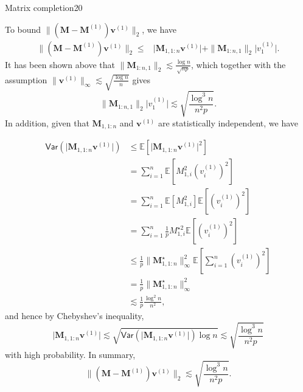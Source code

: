 \documentclass{article}
\begin{document}
\begin{problem}{Matrix completion}{20}
{To bound $\|( {\bm{M}}- {\bm{M}}^{(1)}) {\bm{v}}^{(1)}\|_{2}$,
we have
\begin{align*}
\|( {\bm{M}}- {\bm{M}}^{(1)}) {\bm{v}}^{(1)}\|_{2}\leq & \big| {\bm{M}}_{1,1:n} {\bm{v}}^{(1)}\big|+\| {\bm{M}}_{1:n,1}\|_{2}\big| {v}_{1}^{(1)}\big|.
\end{align*}
It has been shown above that $\| {\bm{M}}_{1:n,1}\|_{2}\lesssim\frac{\log n}{\sqrt{np}}$,
which together with the assumption $\| {\bm{v}}^{(1)}\|_{\infty}\lesssim\sqrt{\frac{\log n}{n}}$
gives
\[
\| {\bm{M}}_{1:n,1}\|_{2}\big| {v}_{1}^{(1)}\big|\lesssim\sqrt{\frac{\log^{3}n}{n^{2}p}}.
\]
In addition, given that $ {\bm{M}}_{1,1:n}$ and $ {\bm{v}}^{(1)}$
are statistically independent, we have

\begin{align*}
\mathsf{Var}\left(\big| {\bm{M}}_{1,1:n} {\bm{v}}^{(1)}\big|\right) & \leq\mathbb{E}\left[\big| {\bm{M}}_{1,1:n} {\bm{v}}^{(1)}\big|^{2}\right]\\
 & =\sum_{i=1}^{n} \mathbb{E}\left[  {M}^2_{1,i} ( {v}_{i}^{(1)})^2 \right] \\
  & =\sum_{i=1}^{n} \mathbb{E}\left[  {M}^2_{1,i} \right] \mathbb{E}\left[ ( {v}_{i}^{(1)})^2 \right] \\
 & =\sum_{i=1}^{n} \frac{1}{p} M^{\star2}_{1,i} \mathbb{E}\left[ ( {v}_{i}^{(1)})^2 \right] \\
 & \leq \frac{1}{p}\|\bm{M}^\star_{1,1:n} \|_{\infty}^{2} \mathbb{E}\left[ \sum_{i=1}^{n} ( {v}_{i}^{(1)})^2 \right] \\
 & = \frac{1}{p}\|\bm{M}^\star_{1,1:n} \|_{\infty}^{2} \\
 & \lesssim\frac{1}{p}\frac{\log^{2}n}{n^{2}},
\end{align*}
and hence by Chebyshev's inequality, 
\[
\big| {\bm{M}}_{1,1:n} {\bm{v}}^{(1)}\big|\lesssim\sqrt{\mathsf{Var}\left(\big| {\bm{M}}_{1,1:n} {\bm{v}}^{(1)}\big|\right)\log n}\lesssim\sqrt{\frac{\log^{3}n}{n^{2}p}}
\]
with high probability. In summary, 
\[
\|( {\bm{M}}- {\bm{M}}^{(1)}) {\bm{v}}^{(1)}\|_{2}\lesssim\sqrt{\frac{\log^{3}n}{n^{2}p}}.
\]

}
\end{problem}
\end{document}
